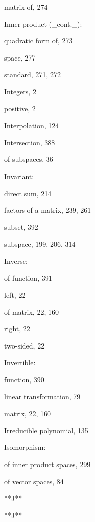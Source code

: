 matrix of, 274

Inner product (_cont._):

quadratic form of, 273

space, 277

standard, 271, 272

Integers, 2

positive, 2

Interpolation, 124

Intersection, 388

of subspaces, 36

Invariant:

direct sum, 214

factors of a matrix, 239, 261

subset, 392

subspace, 199, 206, 314

Inverse:

of function, 391

left, 22

of matrix, 22, 160

right, 22

two-sided, 22

Invertible:

function, 390

linear transformation, 79

matrix, 22, 160

Irreducible polynomial, 135

Isomorphism:

of inner product spaces, 299

of vector spaces, 84

**J**

**J**
 